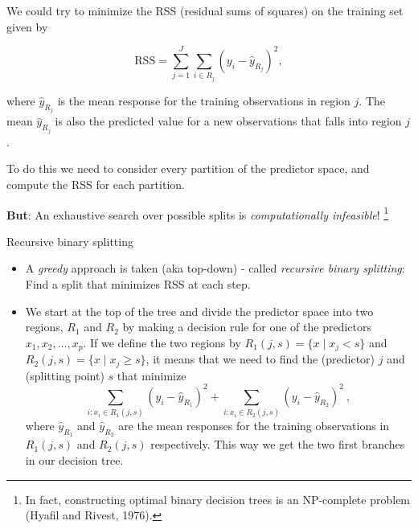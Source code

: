 \documentclass[10pt,ignorenonframetext,]{beamer}
\begin{document}
\begin{frame}

We could try to minimize the RSS (residual sums of squares) on the
training set given by

\[
\text{RSS}=\sum_{j=1}^J \sum_{i \in R_j}(y_i-\hat{y}_{R_j})^2,
\]

where \(\hat{y}_{R_j}\) is the mean response for the training
observations in region \(j\). The mean \(\hat{y}_{R_j}\) is also the
predicted value for a new observations that falls into region \(j\).

To do this we need to consider every partition of the predictor space,
and compute the RSS for each partition.

\textbf{But}: An exhaustive search over possible splits is
\emph{computationally infeasible}!
\footnote{In fact, constructing optimal binary decision trees is an NP-complete problem (Hyafil and Rivest, 1976).}

\end{frame}

\begin{frame}

\begin{block}{Recursive binary splitting}

\vspace{2mm}

\begin{itemize}
\item
  A \emph{greedy} approach is taken (aka top-down) - called
  \emph{recursive binary splitting}: Find a split that minimizes RSS at
  each step.
\item
  We start at the top of the tree and divide the predictor space into
  two regions, \(R_1\) and \(R_2\) by making a decision rule for one of
  the predictors \(x_1, x_2,...,x_p\). If we define the two regions by
  \(R_1(j,s)=\{x \mid x_j<s\}\) and \(R_2(j,s)=\{x \mid x_j\geq s\}\),
  it means that we need to find the (predictor) \(j\) and (splitting
  point) \(s\) that minimize
  \[\sum_{i: x_i \in R_1(j,s)}(y_i-\hat{y}_{R_1})^2+\sum_{i: x_i \in R_2(j,s)}(y_i -\hat{y}_{R_2})^2 \ ,\]
  where \(\hat{y}_{R_1}\) and \(\hat{y}_{R_2}\) are the mean responses
  for the training observations in \(R_1(j,s)\) and \(R_2(j,s)\)
  respectively. This way we get the two first branches in our decision
  tree.
\end{itemize}

\end{block}

\end{frame}
\end{document}
